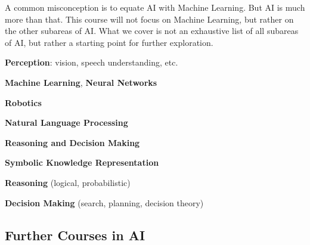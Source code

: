 A common misconception is to equate AI with Machine Learning. But AI is much more than that. This course will not focus on Machine Learning, but rather on the other subareas of AI. What we cover is not an exhaustive list of all subareas of AI, but rather a starting point for further exploration.

\begin{listu}
    \item \textbf{Perception}: vision, speech understanding, etc.
    \item \textbf{Machine Learning}, \textbf{Neural Networks}
    \item \textbf{Robotics}
    \item \textbf{Natural Language Processing}
    \item \textbf{Reasoning and Decision Making}
    \begin{listu}
        \item \textbf{Symbolic Knowledge Representation}
        \item \textbf{Reasoning} (logical, probabilistic)
        \item \textbf{Decision Making} (search, planning, decision theory)
    \end{listu}
\end{listu}

\subsection{Further Courses in AI}

